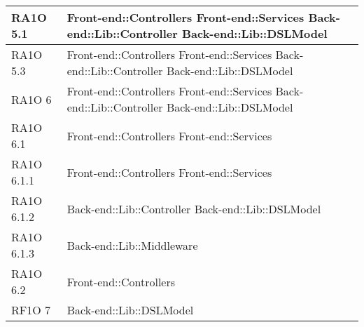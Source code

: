 \begin{center}
\begin{longtable}{|p{3cm}|p{5cm}|}
	  RA1O 5.1 & Front-end::Controllers \newline
	  			Front-end::Services \newline
	  			Back-end::Lib::Controller \newline
	  			Back-end::Lib::DSLModel \\ \hline
	  RA1O 5.3 & Front-end::Controllers \newline
	  			Front-end::Services \newline
	  			Back-end::Lib::Controller \newline
	  			Back-end::Lib::DSLModel \\ \hline
	  RA1O 6 & Front-end::Controllers \newline
	  			Front-end::Services \newline
	  			Back-end::Lib::Controller \newline
	  			Back-end::Lib::DSLModel \\ \hline
	  RA1O 6.1 & Front-end::Controllers \newline
	  			Front-end::Services \\ \hline
	  RA1O 6.1.1 & Front-end::Controllers \newline
	  			Front-end::Services \\ \hline
	  RA1O 6.1.2	 & Back-end::Lib::Controller \newline
	  			Back-end::Lib::DSLModel \\ \hline
	  RA1O 6.1.3 & Back-end::Lib::Middleware \\ \hline
	  RA1O 6.2 & Front-end::Controllers \\ \hline
      RF1O 7 & Back-end::Lib::DSLModel \\ \hline		      
      			
		      
       \end{longtable}
      \egroup
      \end{center}  
\clearpage